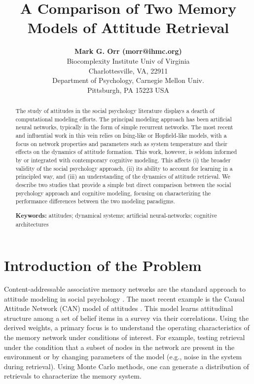 \documentclass[10pt,letterpaper]{article}
\title{A Comparison of Two Memory Models of Attitude Retrieval}
\author{{\large \bf Mark G. Orr (morr@ihmc.org)} \\
  Biocomplexity Institute Univ of Virginia \\
  Charlottesville, VA, 22911
  \AND {\large \bf Lebiere, } \\
  Department of Psychology, Carnegie Mellon Univ.  \\
  Pittsburgh, PA 15223 USA}
\begin{document}
\maketitle

\begin{abstract}
The study of attitudes in the social psychology literature displays a dearth of computational modeling efforts. The principal modeling approach has been artificial neural networks, typically in the form of simple recurrent networks. The most recent and influential work in this vein relies on Ising-like or Hopfield-like models, with a focus on network properties and parameters such as system temperature and their effects on the dynamics of attitude formation.  This work, however, is seldom informed by or integrated with contemporary cognitive modeling. This affects (i) the broader validity of the social psychology approach, (ii) its ability to account for learning in a principled way, and (iii) an understanding of the dynamics of attitude retrieval. We describe two studies that provide a simple but direct comparison between the social psychology approach and cognitive modeling, focusing on characterizing the performance differences between the two modeling paradigms. 

\textbf{Keywords:} 
attitudes; dynamical systems; artificial neural-networks; cognitive architectures
\end{abstract}


\section{Introduction of the Problem}
Content-addressable associative memory networks are the standard approach to attitude modeling in social psychology \citep{OrrThrushPlaut2013,van2005connectionist,MonroeRead2008}. The most recent example is the Causal Attitude Network (CAN) model of attitudes \citep{dalege2016,DalegeBorsboom_2018}.  This model learns attitudinal structure among a set of belief items in a survey via their correlations. Using the derived weights, a primary focus is to understand the operating characteristics of the memory network under conditions of interest. For example, testing retrieval under the condition that a subset of nodes in the network are present in the environment or by changing parameters of the model (e.g., noise in the system during retrieval).  Using Monte Carlo methods, one can generate a distribution of retrievals to characterize the memory system.
\end{document}
